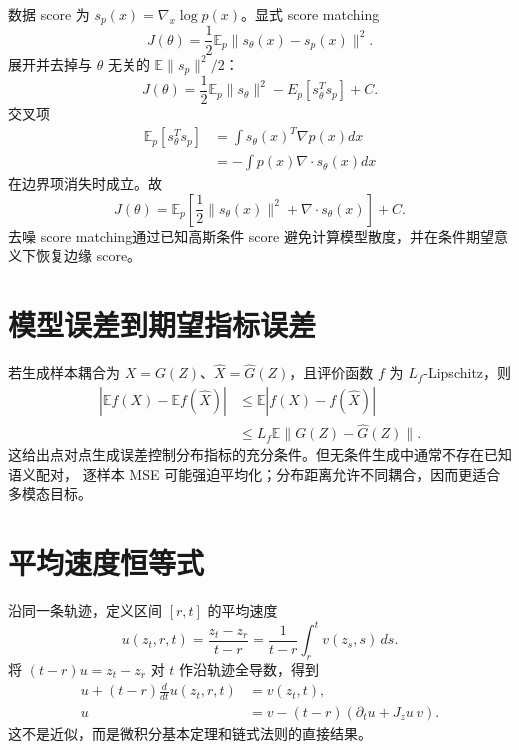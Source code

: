 \documentclass[11pt]{article}
\numberwithin{equation}{section}
\newcommand{\E}{\mathbb{E}}
\newcommand{\1}{\mathbf{1}}
\begin{document}
数据 score 为 $s_p(x)=\nabla_x\log p(x)$。显式 score matching
\begin{equation}
 J(\theta)=\frac12\E_p\|s_\theta(x)-s_p(x)\|^2.
\end{equation}
展开并去掉与 $\theta$ 无关的 $\E\|s_p\|^2/2$：
\begin{equation}
 J(\theta)=\frac12\E_p\|s_\theta\|^2-E_p[s_\theta^Ts_p]+C.
\end{equation}
交叉项
\begin{align}
 \E_p[s_\theta^Ts_p]
 &=\int s_\theta(x)^T\nabla p(x)dx\\
 &=-\int p(x)\nabla\cdot s_\theta(x)dx
\end{align}
在边界项消失时成立。故
\begin{equation}
 J(\theta)=\E_p\left[
 \frac12\|s_\theta(x)\|^2+\nabla\cdot s_\theta(x)
 \right]+C.
\end{equation}
去噪 score matching通过已知高斯条件 score 避免计算模型散度，并在条件期望意义下恢复边缘 score。

\section{模型误差到期望指标误差}

若生成样本耦合为 $X=G(Z)$、$\widehat X=\widehat G(Z)$，且评价函数
$f$ 为 $L_f$-Lipschitz，则
\begin{align}
 |\E f(X)-\E f(\widehat X)|
 &\le\E|f(X)-f(\widehat X)|\\
 &\le L_f\E\|G(Z)-\widehat G(Z)\|.
\end{align}
这给出点对点生成误差控制分布指标的充分条件。但无条件生成中通常不存在已知语义配对，
逐样本 MSE 可能强迫平均化；分布距离允许不同耦合，因而更适合多模态目标。

\section{平均速度恒等式}
沿同一条轨迹，定义区间 $[r,t]$ 的平均速度
\begin{equation}
  u(z_t,r,t)=\frac{z_t-z_r}{t-r}
  =\frac{1}{t-r}\int_r^t v(z_s,s)\,ds.
  \label{eq:mean-velocity}
\end{equation}
将 $(t-r)u=z_t-z_r$ 对 $t$ 作沿轨迹全导数，得到
\begin{align}
  u+(t-r)\frac{d}{dt}u(z_t,r,t)&=v(z_t,t),\\
  u&=v-(t-r)\left(\partial_tu+J_zu\,v\right).
  \label{eq:meanflow-identity}
\end{align}
这不是近似，而是微积分基本定理和链式法则的直接结果。
\end{document}
